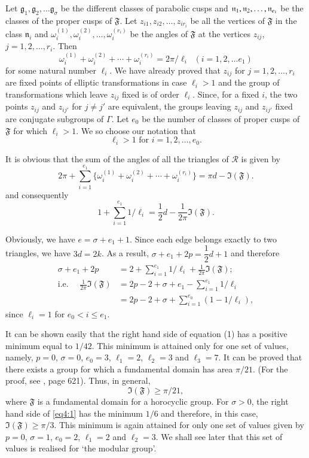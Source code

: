 Let $\mathfrak{g}_1, \mathfrak{g}_2, \ldots \mathfrak{g}_{\sigma}$ be the
different classes of parabolic cusps and $\mathfrak{n}_1,\break
\mathfrak{n}_2, \ldots , \mathfrak{n}_{e_1}$ be the classes of the
proper cusps of $\mathfrak{F}$. Let $z_{i1}, z_{i2}, \ldots,
z_{ir_{i}}$ be all the vertices of $\mathfrak{F}$ in the class
$\mathfrak{n}_i$ and $\omega^{(1)}_i, \omega^{(2)}_i, \ldots
,\omega^{(r_i)}_i$ be the angles of $\mathfrak{F}$ at the vertices
$z_{ij}$, $j=1,2,\ldots, r_i$. Then 
$$ 
\omega^{(1)}_i + \omega^{(2)}_i + \cdots + \omega^{(r_i)}_i = 2
\pi/\ell_i \;\; (i = 1, 2, \ldots e_1)
$$
for some natural number $\ell_i$. We have already proved that $z_{ij}$
for $j=1,2, \ldots ,r_i$ are fixed points of elliptic transformations
in case $\ell_i >1$ and the group of transformations which leave
$z_{ij}$ fixed is of order $\ell_i$. Since, for a fixed $i$, the two
points $z_{ij}$ and $z_{ij'}$ for $j \neq j'$ are equivalent, the
groups leaving $z_{ij}$ and $z_{ij'}$ fixed are conjugate subgroups of
$\Gamma$. Let $e_0$ be the number of classes of proper cusps of
$\mathfrak{F}$ for which $\ell_i >1$. We so choose our notation that 
$$
\ell_i > 1 \text{ for } i = 1,2, \ldots, e_0.
$$

It is obvious that the sum of the angles of all the triangles of
$\mathscr{R}$ is given by \pageoriginale
$$
2 \pi  + \sum^{e_1}_{i=1} \{\omega^{(1)}_i + \omega^{(2)}_i + \cdots + 
\omega^{(r_{i})}_i\} = \pi d - \mathfrak{I} (\mathfrak{F}).
$$
and consequently
$$
1 + \sum^{e_1}_{i=1} 1/\ell_i = \frac{1}{2} d -\frac{1}{2\pi} 
\mathfrak{I} (\mathfrak{F}). 
$$

Obviously, we have $e=\sigma + e_1 + 1$. Since each edge belongs
exactly to two triangles, we have $3d = 2k$. As a result, $\sigma +
e_1 + 2 p =\dfrac{1}{2}d+1$ and therefore 
\begin{align*}
\sigma + e_1 + 2p & = 2 + \sum^{e_1}_{i=1} 1/\ell_i + \frac{1}{2\pi}
\mathfrak{I} (\mathfrak{F}); \\
\text{i.e. } \quad\frac{1}{2\pi} \mathfrak{I} (\mathfrak{F})
& = 2p - 2 + \sigma + e_1 - \sum^{e_1}_{i=1} 1/\ell_i\\
& = 2p - 2 + \sigma + \sum^{e_0}_{i=1} (1-1/\ell_i), \tag{1}\label{eq4:1}
\end{align*}
since $\ell_i = 1$ for $e_0 < i \leq e_1$.

It can be shown easily that the right hand side of equation (1) has a
positive minimum equal to $1/42$. This minimum is attained only
for one set of values, namely, $p=0$, $\sigma=0$, $e_0=3$, $\ell_1=2$,
$\ell_2=3$ and $\ell_3 = 7$. It can be proved that there exists a
group for which a fundamental domain has area $\pi/21$. (For the
proof, see \cite{c1:key2}, page 621). Thus, in general, 
$$
\mathfrak{I} (\mathfrak{F}) \geq \pi / 21,
$$
where $\mathfrak{F}$ is a fundamental domain for a horocyclic
group. For $\sigma >0$, the right hand side of \eqref{eq4:1} has the minimum
$1/6$ and therefore, in this case, $\mathfrak{I}(\mathfrak{F}) \geq
\pi/3$. This minimum is again attained for only one set of values
given \pageoriginale by $p=0$, $\sigma=1$, $e_0 = 2$, $\ell_1=2$ and
$\ell_2 =3$. We shall see later that this set of values is realised
for `the modular group'.

